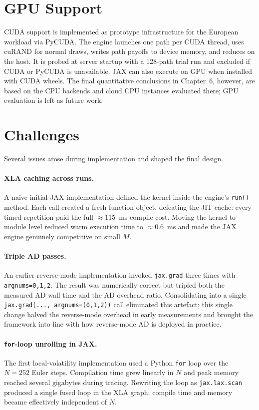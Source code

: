 \section{GPU Support}
\label{sec:impl-gpu}

CUDA support is implemented as prototype infrastructure for the European
workload via PyCUDA. The engine launches one path per CUDA thread, uses cuRAND
for normal draws, writes path payoffs to device memory, and reduces on the host.
It is probed at server startup with a 128-path trial run and excluded if CUDA or
PyCUDA is unavailable. JAX can also execute on GPU when installed with CUDA
wheels. The final quantitative conclusions in Chapter~6, however, are based on
the CPU backends and cloud CPU instances evaluated there; GPU evaluation is left
as future work.

\section{Challenges}
\label{sec:impl-challenges}

Several issues arose during implementation and shaped the final design.

\paragraph{XLA caching across runs.}
A naive initial JAX implementation defined the kernel inside the engine's
\texttt{run()} method. Each call created a fresh function object, defeating
the JIT cache: every timed repetition paid the full $\approx115$~ms compile
cost. Moving the kernel to module level reduced warm execution time to
$\approx0.6$~ms and made the JAX engine genuinely competitive on small $M$.

\paragraph{Triple AD passes.}
An earlier reverse-mode implementation invoked \texttt{jax.grad} three times
with \texttt{argnums=0,1,2}. The result was numerically correct but tripled
both the measured AD wall time and the AD overhead ratio. Consolidating into a
single \texttt{jax.grad(..., argnums=(0,1,2))} call eliminated this artefact;
this single change halved the reverse-mode overhead in early measurements and
brought the framework into line with how reverse-mode AD is deployed in
practice.

\paragraph{\texttt{for}-loop unrolling in JAX.}
The first local-volatility implementation used a Python \texttt{for} loop over
the $N=252$ Euler steps. Compilation time grew linearly in $N$ and peak memory
reached several gigabytes during tracing. Rewriting the loop as
\texttt{jax.lax.scan} produced a single fused loop in the XLA graph; compile
time and memory became effectively independent of $N$.

